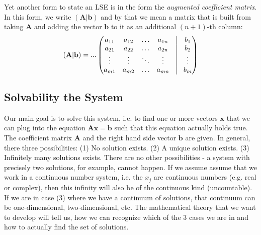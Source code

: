 
Yet another form to state an LSE is in the form the \emph{augmented coefficient matrix}. In this form, we write $(\mathbf{A|b})$ and by that we mean a matrix that is built from taking $\mathbf{A}$ and adding the vector $\mathbf{b}$ to it as an additional $(n+1)$-th column:
\begin{equation}
(\mathbf{A|b}) = ...
\begin{pmatrix}
a_{11} & a_{12} & \ldots & a_{1n} & \vline & b_1    \\
a_{21} & a_{22} & \ldots & a_{2n} & \vline & b_2    \\ 
\vdots & \vdots & \ddots & \vdots & \vline & \vdots \\
a_{m1} & a_{m2} & \ldots & a_{mn} & \vline & b_m  
\end{pmatrix}
\end{equation}





\subsection{Solvability the System}
Our main goal is to solve this system, i.e. to find one or more vectors $\mathbf{x}$ that we can plug into the equation $\mathbf{A x} = \mathbf{b}$ such that this equation actually holds true. The coefficient matrix $\mathbf{A}$ and the right hand side vector $\mathbf{b}$ are given. In general, there three possibilities: (1) No solution exists. (2) A unique solution exists. (3) Infinitely many solutions exists. There are no other possibilities - a system with precisely two solutions, for example, cannot happen. If we assume assume that we work in a continuous number system, i.e. the $x_j$ are continuous numbers (e.g. real or complex), then this infinity will also be of the continuous kind (uncountable). If we are in case (3) where we have a continuum of solutions, that continuum can be one-dimensional, two-dimensional, etc. The mathematical theory that we want to develop will tell us, how we can recognize which of the 3 cases we are in and how to actually find the set of solutions.


